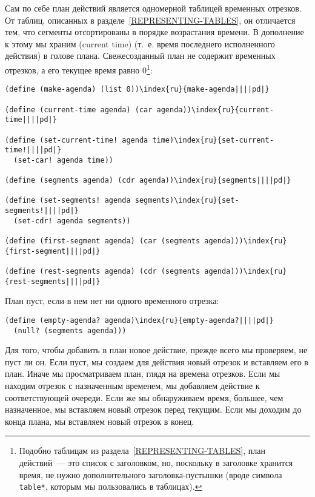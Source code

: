 Сам по себе план действий является одномерной
таблицей
временных отрезков.  От таблиц, описанных в
разделе~\ref{REPRESENTING-TABLES}, он отличается тем, что сегменты
отсортированы в порядке возрастания времени.  В дополнение к этому мы
храним  (current time) (т.~е. время
последнего исполненного действия) в голове плана.  Свежесозданный план
не содержит временных отрезков, а его текущее время равно 0\footnote{Подобно таблицам из
раздела~\ref{REPRESENTING-TABLES}, план действий~--- это
список с заголовком, но, поскольку в заголовке хранится время, не нужно
дополнительного заголовка-пустышки (вроде символа
{\tt *table*}, которым мы пользовались в таблицах).
}:

\begin{Verbatim}[fontsize=\small]
(define (make-agenda) (list 0))\index{ru}{make-agenda||||pd|}

(define (current-time agenda) (car agenda))\index{ru}{current-time||||pd|}

(define (set-current-time! agenda time)\index{ru}{set-current-time!||||pd|}
  (set-car! agenda time))

(define (segments agenda) (cdr agenda))\index{ru}{segments||||pd|}

(define (set-segments! agenda segments)\index{ru}{set-segments!||||pd|}
  (set-cdr! agenda segments))

(define (first-segment agenda) (car (segments agenda)))\index{ru}{first-segment||||pd|}

(define (rest-segments agenda) (cdr (segments agenda)))\index{ru}{rest-segments||||pd|}
\end{Verbatim}
План пуст, если в нем нет ни одного временного отрезка:

\begin{Verbatim}[fontsize=\small]
(define (empty-agenda? agenda)\index{ru}{empty-agenda?||||pd|}
  (null? (segments agenda)))
\end{Verbatim}

Для того, чтобы добавить в план новое действие, прежде
всего мы проверяем, не пуст ли он.  Если пуст, мы создаем для действия
новый отрезок и вставляем его в план.  Иначе мы просматриваем
план, глядя на времена отрезков.  Если мы находим отрезок с
назначенным временем, мы добавляем действие к соответствующей
очереди.  Если же мы обнаруживаем время, большее, чем назначенное, мы
вставляем новый отрезок перед текущим. Если мы доходим до конца плана,
мы вставляем новый отрезок в конец.

